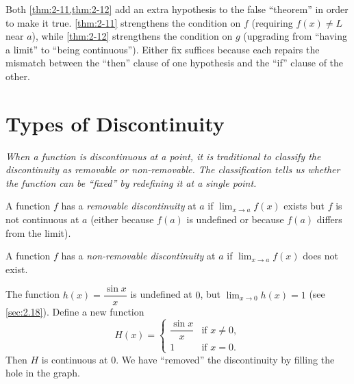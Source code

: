\begin{remark}
Both \cref{thm:2-11,thm:2-12} add an extra hypothesis to the false ``theorem'' in order to make it true.  \cref{thm:2-11} strengthens the condition on $f$ (requiring $f(x) \neq L$ near $a$), while \cref{thm:2-12} strengthens the condition on $g$ (upgrading from ``having a limit'' to ``being continuous'').  Either fix suffices because each repairs the mismatch between the ``then'' clause of one hypothesis and the ``if'' clause of the other.
\end{remark}

\section{Types of Discontinuity}
\label{sec:2.17}

\textit{When a function is discontinuous at a point, it is traditional to classify the discontinuity as removable or non-removable.  The classification tells us whether the function can be ``fixed'' by redefining it at a single point.}

\begin{definition}
\label{def:2-8}
A function $f$ has a \emph{removable discontinuity} at $a$ if $\lim_{x \to a} f(x)$ exists but $f$ is not continuous at $a$ (either because $f(a)$ is undefined or because $f(a)$ differs from the limit).
\end{definition}

\begin{definition}
\label{def:2-9}
A function $f$ has a \emph{non-removable discontinuity} at $a$ if $\lim_{x \to a} f(x)$ does not exist.
\end{definition}

\begin{example}
\label{ex:2-11}
The function $h(x) = \dfrac{\sin x}{x}$ is undefined at $0$, but $\lim_{x \to 0} h(x) = 1$ (see \cref{sec:2.18}).  Define a new function
\[
  H(x) =
  \begin{cases}
    \dfrac{\sin x}{x} & \text{if } x \neq 0, \\[6pt]
    1 & \text{if } x = 0.
  \end{cases}
\]
Then $H$ is continuous at $0$.  We have ``removed'' the discontinuity by filling the hole in the graph.
\end{example}

